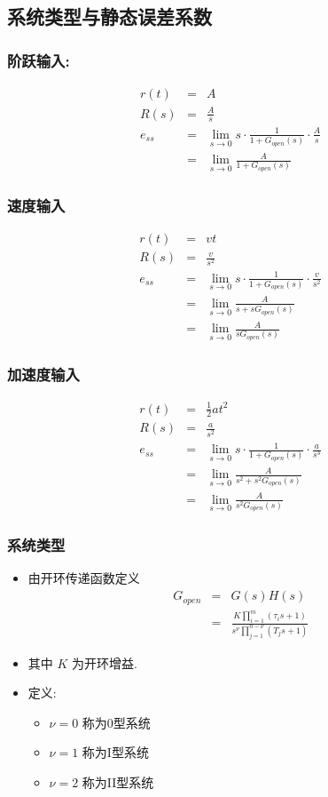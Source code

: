 \documentclass{article}
\begin{document}
\subsection{系统类型与静态误差系数}
\label{sec-3-2}
\begin{frame}
\frametitle{阶跃输入:}
\label{sec-3-2-1}

\begin{eqnarray*}
r(t) & = & A \\
R(s) & = & \frac{A}{s} \\
e_{ss}&=& \lim_{s\rightarrow 0}s \cdot\frac{1}{1+G_{open}(s)}\cdot\frac{A}{s} \\
      &=& \lim_{s\rightarrow 0}\frac{A}{1+G_{open}(s)}
\end{eqnarray*}
\end{frame}
\begin{frame}
\frametitle{速度输入}
\label{sec-3-2-2}

\begin{eqnarray*}
r(t) & = & vt \\
R(s) & = & \frac{v}{s^{2}} \\
e_{ss}&=& \lim_{s\rightarrow 0}s \cdot\frac{1}{1+G_{open}(s)}\cdot\frac{v}{s^{2}} \\
      &=& \lim_{s\rightarrow 0}\frac{A}{s+sG_{open}(s)}\\
      &=& \lim_{s\rightarrow 0}\frac{A}{sG_{open}(s)}
\end{eqnarray*}
\end{frame}
\begin{frame}
\frametitle{加速度输入}
\label{sec-3-2-3}

\begin{eqnarray*}
r(t) & = & \frac{1}{2}at^{2} \\
R(s) & = & \frac{a}{s^{2}} \\
e_{ss}&=& \lim_{s\rightarrow 0}s \cdot\frac{1}{1+G_{open}(s)}\cdot\frac{a}{s^{3}} \\
      &=& \lim_{s\rightarrow 0}\frac{A}{s^{2}+s^{2}G_{open}(s)}\\
      &=& \lim_{s\rightarrow 0}\frac{A}{s^{2}G_{open}(s)}
\end{eqnarray*}
\end{frame}
\begin{frame}
\frametitle{系统类型}
\label{sec-3-2-4}

\begin{itemize}
\item <2->由开环传递函数定义
      \begin{eqnarray*}
       G_{open} & = & G(s)H(s) \\
	       	& = & \frac{K\prod_{i=1}^{m}(\tau_{i}s+1)}{s^{\nu}\prod_{j=1}^{n-\nu}(T_{j}s+1)}
      \end{eqnarray*}
\item <2->其中 $K$ 为开环增益.
\item <3->定义:
\begin{itemize}
\item $\nu=0$ 称为0型系统
\item $\nu=1$ 称为I型系统
\item $\nu=2$ 称为II型系统
\end{itemize}
\end{itemize}
\end{frame}
\end{document}
